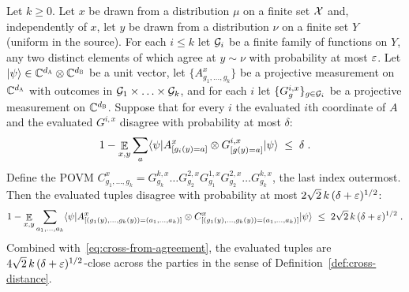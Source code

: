 \begin{lemma}
\label{lem:ar-sandwich-support}
\leanok
Let $k\geq 0$. Let $x$ be drawn from a distribution $\mu$ on a finite set $\mX$ and, independently
of $x$, let $y$ be drawn from a distribution $\nu$ on a finite set $Y$ (uniform in the source).
For each $i\leq k$ let $\cal{G}_i$ be a finite family of functions on $Y$, any two distinct
elements of which agree at $y\sim\nu$ with probability at most $\eps$. Let $\ket{\psi}\in
\C^{d_\alice}\ot\C^{d_\bob}$ be a unit vector, let $\{A^x_{g_1,\ldots,g_k}\}$ be a projective
measurement on $\C^{d_\alice}$ with outcomes in $\cal{G}_1\times\ldots\times\cal{G}_k$, and for
each $i$ let $\{G^{i,x}_g\}_{g\in\cal{G}_i}$ be a projective measurement on $\C^{d_\bob}$. Suppose
that for every $i$ the evaluated $i$th coordinate of $A$ and the evaluated $G^{i,x}$ disagree with
probability at most $\delta$:
\[
  1 - \E_{x,y} \sum_{a} \bra{\psi} A^x_{[g_i(y)=a]} \ot G^{i,x}_{[g(y)=a]} \ket{\psi}
  \;\leq\; \delta\;.
\]
Define the POVM $C^x_{g_1,\ldots,g_k}=G^{k,x}_{g_k}\ldots G^{2,x}_{g_2}G^{1,x}_{g_1}
G^{2,x}_{g_2}\ldots G^{k,x}_{g_k}$, the last index outermost. Then the evaluated tuples disagree
with probability at most $2\sqrt{2}\,k\,(\delta+\eps)^{1/2}$:
\[
  1 - \E_{x,y} \sum_{a_1,\ldots,a_k} \bra{\psi}
    A^x_{[(g_1(y),\ldots,g_k(y))=(a_1,\ldots,a_k)]} \ot
    C^x_{[(g_1(y),\ldots,g_k(y))=(a_1,\ldots,a_k)]} \ket{\psi}
  \;\leq\; 2\sqrt{2}\,k\,(\delta+\eps)^{1/2}\;.
\]
Combined with~\eqref{eq:cross-from-agreement}, the evaluated tuples are
$4\sqrt{2}\,k\,(\delta+\eps)^{1/2}$-close across the parties in the sense of
Definition~\ref{def:cross-distance}.
\end{lemma}

